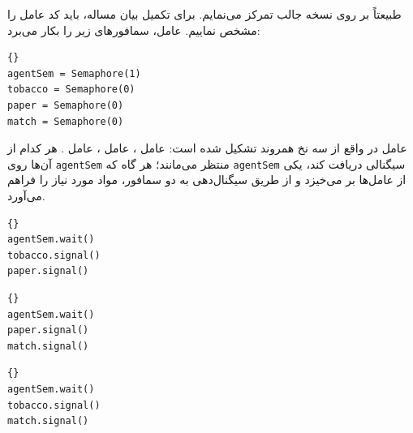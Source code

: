 \documentclass{book}
\begin{document}
    طبیعتاً بر روی نسخه جالب تمرکز می‌نمایم. برای تکمیل بیان مساله، باید کد عامل را مشخص نماییم. عامل، سمافورهای زیر را بکار می‌برد:

\begin{latin}
\begin{latin}
\begin{lstlisting}[title={سمافورهای عامل}]{}
agentSem = Semaphore(1)
tobacco = Semaphore(0)
paper = Semaphore(0)
match = Semaphore(0)
\end{lstlisting}
\end{latin}
\end{latin}

    عامل در واقع از سه نخ همروند تشکیل شده است:  عامل ،  عامل ،  عامل .
    هر کدام از آن‌ها روی {\tt agentSem} منتظر می‌مانند؛ هر گاه که {\tt agentSem} سیگنالی دریافت کند، یکی از عامل‌ها بر می‌خیزد و 
    از طریق سیگنال‌دهی به دو سمافور، مواد مورد نیاز را فراهم می‌آورد. 

\begin{latin}
\begin{latin}
\begin{lstlisting}[title={کد عامل \lr{A}}]{}
agentSem.wait()
tobacco.signal()
paper.signal()
\end{lstlisting}
\end{latin}


\begin{latin}
\begin{lstlisting}[title={کد عامل \lr{B}}]{}
agentSem.wait()
paper.signal()
match.signal()
\end{lstlisting}
\end{latin}

\begin{latin}
\begin{lstlisting}[title={کد عامل \lr{C}}]{}
agentSem.wait()
tobacco.signal()
match.signal()
\end{lstlisting}
\end{latin}
\end{latin}
\end{document}
